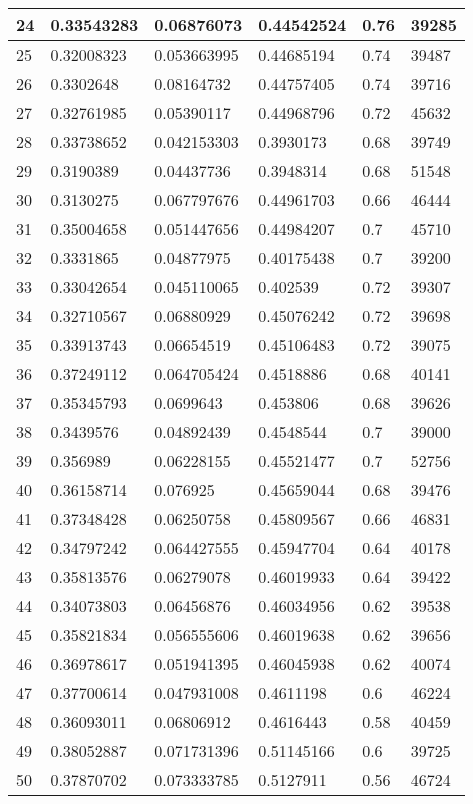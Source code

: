 \begin{longtable}{|l|l|l|l|l|l|}
24 & 0.33543283 & 0.06876073 & 0.44542524 & 0.76 & 39285 \\ \hline 
25 & 0.32008323 & 0.053663995 & 0.44685194 & 0.74 & 39487 \\ \hline 
26 & 0.3302648 & 0.08164732 & 0.44757405 & 0.74 & 39716 \\ \hline 
27 & 0.32761985 & 0.05390117 & 0.44968796 & 0.72 & 45632 \\ \hline 
28 & 0.33738652 & 0.042153303 & 0.3930173 & 0.68 & 39749 \\ \hline 
29 & 0.3190389 & 0.04437736 & 0.3948314 & 0.68 & 51548 \\ \hline 
30 & 0.3130275 & 0.067797676 & 0.44961703 & 0.66 & 46444 \\ \hline 
31 & 0.35004658 & 0.051447656 & 0.44984207 & 0.7 & 45710 \\ \hline 
32 & 0.3331865 & 0.04877975 & 0.40175438 & 0.7 & 39200 \\ \hline 
33 & 0.33042654 & 0.045110065 & 0.402539 & 0.72 & 39307 \\ \hline 
34 & 0.32710567 & 0.06880929 & 0.45076242 & 0.72 & 39698 \\ \hline 
35 & 0.33913743 & 0.06654519 & 0.45106483 & 0.72 & 39075 \\ \hline 
36 & 0.37249112 & 0.064705424 & 0.4518886 & 0.68 & 40141 \\ \hline 
37 & 0.35345793 & 0.0699643 & 0.453806 & 0.68 & 39626 \\ \hline 
38 & 0.3439576 & 0.04892439 & 0.4548544 & 0.7 & 39000 \\ \hline 
39 & 0.356989 & 0.06228155 & 0.45521477 & 0.7 & 52756 \\ \hline 
40 & 0.36158714 & 0.076925 & 0.45659044 & 0.68 & 39476 \\ \hline 
41 & 0.37348428 & 0.06250758 & 0.45809567 & 0.66 & 46831 \\ \hline 
42 & 0.34797242 & 0.064427555 & 0.45947704 & 0.64 & 40178 \\ \hline 
43 & 0.35813576 & 0.06279078 & 0.46019933 & 0.64 & 39422 \\ \hline 
44 & 0.34073803 & 0.06456876 & 0.46034956 & 0.62 & 39538 \\ \hline 
45 & 0.35821834 & 0.056555606 & 0.46019638 & 0.62 & 39656 \\ \hline 
46 & 0.36978617 & 0.051941395 & 0.46045938 & 0.62 & 40074 \\ \hline 
47 & 0.37700614 & 0.047931008 & 0.4611198 & 0.6 & 46224 \\ \hline 
48 & 0.36093011 & 0.06806912 & 0.4616443 & 0.58 & 40459 \\ \hline 
49 & 0.38052887 & 0.071731396 & 0.51145166 & 0.6 & 39725 \\ \hline 
50 & 0.37870702 & 0.073333785 & 0.5127911 & 0.56 & 46724 \\ \hline 
\end{longtable}